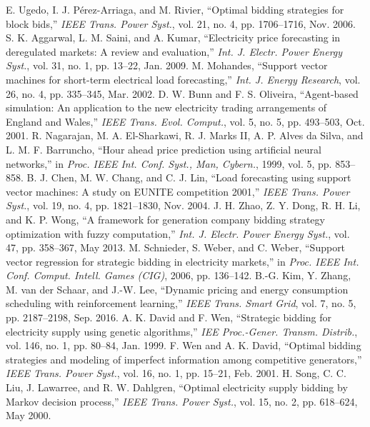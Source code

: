 \documentclass[conference]{IEEEtran}
\begin{document}
\begin{thebibliography}{99}
 E. Ugedo, I. J. Pérez-Arriaga, and M. Rivier, “Optimal bidding strategies for block bids,” \textit{IEEE Trans. Power Syst.}, vol. 21, no. 4, pp. 1706–1716, Nov. 2006. 
 S. K. Aggarwal, L. M. Saini, and A. Kumar, “Electricity price forecasting in deregulated markets: A review and evaluation,” \textit{Int. J. Electr. Power Energy Syst.}, vol. 31, no. 1, pp. 13–22, Jan. 2009. 
 M. Mohandes, “Support vector machines for short-term electrical load forecasting,” \textit{Int. J. Energy Research}, vol. 26, no. 4, pp. 335–345, Mar. 2002.
 D. W. Bunn and F. S. Oliveira, “Agent-based simulation: An application to the new electricity trading arrangements of England and Wales,” \textit{IEEE Trans. Evol. Comput.}, vol. 5, no. 5, pp. 493–503, Oct. 2001. %
 R. Nagarajan, M. A. El-Sharkawi, R. J. Marks II, A. P. Alves da Silva, and L. M. F. Barruncho, “Hour ahead price prediction using artificial neural networks,” in \textit{Proc. IEEE Int. Conf. Syst., Man, Cybern.}, 1999, vol. 5, pp. 853–858. 
 B. J. Chen, M. W. Chang, and C. J. Lin, “Load forecasting using support vector machines: A study on EUNITE competition 2001,” \textit{IEEE Trans. Power Syst.}, vol. 19, no. 4, pp. 1821–1830, Nov. 2004. 
 J. H. Zhao, Z. Y. Dong, R. H. Li, and K. P. Wong, “A framework for generation company bidding strategy optimization with fuzzy computation,” \textit{Int. J. Electr. Power Energy Syst.}, vol. 47, pp. 358–367, May 2013. 
 M. Schnieder, S. Weber, and C. Weber, “Support vector regression for strategic bidding in electricity markets,” in \textit{Proc. IEEE Int. Conf. Comput. Intell. Games (CIG)}, 2006, pp. 136–142. 
 B.-G. Kim, Y. Zhang, M. van der Schaar, and J.-W. Lee, “Dynamic pricing and energy consumption scheduling with reinforcement learning,” \textit{IEEE Trans. Smart Grid}, vol. 7, no. 5, pp. 2187–2198, Sep. 2016.
 A. K. David and F. Wen, “Strategic bidding for electricity supply using genetic algorithms,” \textit{IEE Proc.-Gener. Transm. Distrib.}, vol. 146, no. 1, pp. 80–84, Jan. 1999. 
 F. Wen and A. K. David, “Optimal bidding strategies and modeling of imperfect information among competitive generators,” \textit{IEEE Trans. Power Syst.}, vol. 16, no. 1, pp. 15–21, Feb. 2001. 
 H. Song, C. C. Liu, J. Lawarree, and R. W. Dahlgren, “Optimal electricity supply bidding by Markov decision process,” \textit{IEEE Trans. Power Syst.}, vol. 15, no. 2, pp. 618–624, May 2000. 

\end{thebibliography}
\end{document}

